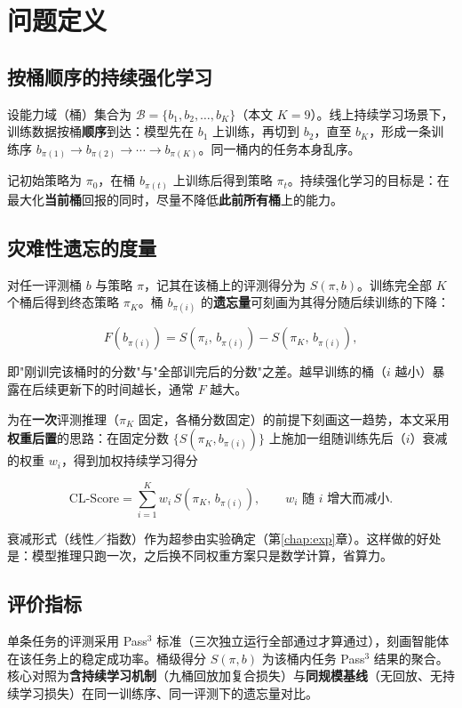\chapter{问题定义}
\label{chap:problem}

\section{按桶顺序的持续强化学习}

设能力域（桶）集合为 $\mathcal{B}=\{b_1,b_2,\dots,b_K\}$（本文 $K=9$）。线上持续学习场景下，训练数据按桶\textbf{顺序}到达：模型先在 $b_1$ 上训练，再切到 $b_2$，直至 $b_K$，形成一条训练序 $b_{\pi(1)}\to b_{\pi(2)}\to\cdots\to b_{\pi(K)}$。同一桶内的任务本身乱序。

记初始策略为 $\pi_0$，在桶 $b_{\pi(t)}$ 上训练后得到策略 $\pi_t$。持续强化学习的目标是：在最大化\textbf{当前桶}回报的同时，尽量不降低\textbf{此前所有桶}上的能力。

\section{灾难性遗忘的度量}

对任一评测桶 $b$ 与策略 $\pi$，记其在该桶上的评测得分为 $S(\pi, b)$。训练完全部 $K$ 个桶后得到终态策略 $\pi_K$。桶 $b_{\pi(i)}$ 的\textbf{遗忘量}可刻画为其得分随后续训练的下降：

\begin{equation}
  F(b_{\pi(i)}) = S(\pi_i,\, b_{\pi(i)}) - S(\pi_K,\, b_{\pi(i)}),
\end{equation}

即"刚训完该桶时的分数"与"全部训完后的分数"之差。越早训练的桶（$i$ 越小）暴露在后续更新下的时间越长，通常 $F$ 越大。

为在\textbf{一次}评测推理（$\pi_K$ 固定，各桶分数固定）的前提下刻画这一趋势，本文采用\textbf{权重后置}的思路：在固定分数 $\{S(\pi_K, b_{\pi(i)})\}$ 上施加一组随训练先后（$i$）衰减的权重 $w_i$，得到加权持续学习得分

\begin{equation}
  \text{CL-Score} = \sum_{i=1}^{K} w_i \, S(\pi_K,\, b_{\pi(i)}),
  \qquad w_i \text{ 随 } i \text{ 增大而减小}.
\end{equation}

衰减形式（线性／指数）作为超参由实验确定（第\ref{chap:exp}章）。这样做的好处是：模型推理只跑一次，之后换不同权重方案只是数学计算，省算力。

\section{评价指标}

单条任务的评测采用 Pass$^3$ 标准（三次独立运行全部通过才算通过），刻画智能体在该任务上的稳定成功率。桶级得分 $S(\pi,b)$ 为该桶内任务 Pass$^3$ 结果的聚合。核心对照为\textbf{含持续学习机制}（九桶回放加复合损失）与\textbf{同规模基线}（无回放、无持续学习损失）在同一训练序、同一评测下的遗忘量对比。

